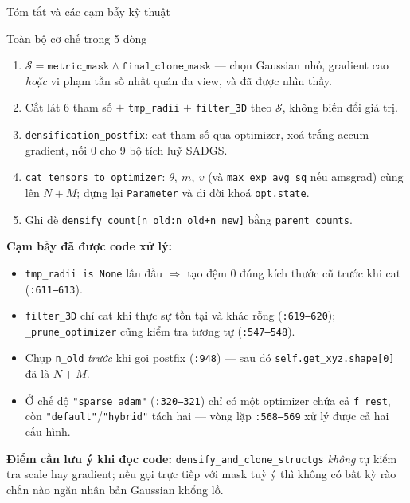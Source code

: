 \begin{frame}{Tóm tắt và các cạm bẫy kỹ thuật}
\footnotesize
\begin{block}{\footnotesize Toàn bộ cơ chế trong 5 dòng}
\begin{enumerate}
\item $\mathcal{S}=\texttt{metric\_mask}\wedge\texttt{final\_clone\_mask}$ — chọn Gaussian nhỏ, gradient cao \emph{hoặc} vi phạm tần số nhất quán đa view, và đã được nhìn thấy.
\item Cắt lát 6 tham số $+$ \texttt{tmp\_radii} $+$ \texttt{filter\_3D} theo $\mathcal{S}$, không biến đổi giá trị.
\item \texttt{densification\_postfix}: cat tham số qua optimizer, xoá trắng accum gradient, nối 0 cho 9 bộ tích luỹ SADGS.
\item \texttt{cat\_tensors\_to\_optimizer}: $\theta,\ m,\ v$ (và \texttt{max\_exp\_avg\_sq} nếu amsgrad) cùng lên $N+M$; dựng lại \texttt{Parameter} và di dời khoá \texttt{opt.state}.
\item Ghi đè \texttt{densify\_count[n\_old:n\_old+n\_new]} bằng \texttt{parent\_counts}.
\end{enumerate}
\end{block}
\textbf{Cạm bẫy đã được code xử lý:}
\begin{itemize}
\item \texttt{tmp\_radii is None} lần đầu $\Rightarrow$ tạo đệm 0 đúng kích thước cũ trước khi cat (\texttt{:611--613}).
\item \texttt{filter\_3D} chỉ cat khi thực sự tồn tại và khác rỗng (\texttt{:619--620}); \texttt{\_prune\_optimizer} cũng kiểm tra tương tự (\texttt{:547--548}).
\item Chụp \texttt{n\_old} \emph{trước} khi gọi postfix (\texttt{:948}) — sau đó \texttt{self.get\_xyz.shape[0]} đã là $N+M$.
\item Ở chế độ \texttt{"sparse\_adam"} (\texttt{:320--321}) chỉ có một optimizer chứa cả \texttt{f\_rest}, còn \texttt{"default"}/\texttt{"hybrid"} tách hai — vòng lặp \texttt{:568--569} xử lý được cả hai cấu hình.
\end{itemize}
\textbf{Điểm cần lưu ý khi đọc code:} \texttt{densify\_and\_clone\_structgs} \emph{không} tự kiểm tra scale hay gradient; nếu gọi trực tiếp với mask tuỳ ý thì không có bất kỳ rào chắn nào ngăn nhân bản Gaussian khổng lồ.
\end{frame}
